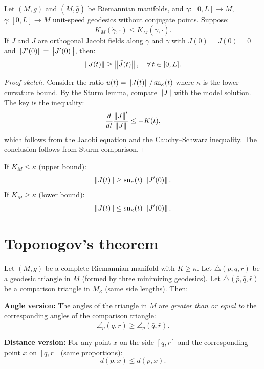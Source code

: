 \begin{theorem}[Rauch]
\label{thm:rauch}
Let $(M, g)$ and $(\bar{M}, \bar{g})$ be Riemannian manifolds, and
$\gamma : [0, L] \to M$, $\bar\gamma : [0, L] \to \bar{M}$ unit-speed geodesics
without conjugate points. Suppose:
\[
    K_M(\dot\gamma, \cdot) \leq K_{\bar{M}}(\dot{\bar\gamma}, \cdot).
\]
If $J$ and $\bar{J}$ are orthogonal Jacobi fields along $\gamma$ and $\bar\gamma$
with $J(0) = \bar{J}(0) = 0$ and $\left\| J'(0) \right\| = \left\| \bar{J}'(0) \right\|$, then:
\[
    \left\| J(t) \right\| \geq \left\| \bar{J}(t) \right\|, \quad \forall\, t \in [0, L].
\]
\end{theorem}

\begin{proof}[Proof sketch]
Consider the ratio $u(t) = \left\| J(t) \right\|/\operatorname{sn}_\kappa(t)$ where
$\kappa$ is the lower curvature bound. By the Sturm lemma, compare $\left\| J \right\|$
with the model solution. The key is the inequality:
\[
    \frac{d}{dt}\frac{\left\| J \right\|'}{\left\| J \right\|} \leq -K(t),
\]
which follows from the Jacobi equation and the Cauchy--Schwarz inequality.
The conclusion follows from Sturm comparison.
\end{proof}

\begin{corollary}
If $K_M \leq \kappa$ (upper bound):
\[
    \left\| J(t) \right\| \geq \operatorname{sn}_\kappa(t)\, \left\| J'(0) \right\|.
\]
If $K_M \geq \kappa$ (lower bound):
\[
    \left\| J(t) \right\| \leq \operatorname{sn}_\kappa(t)\, \left\| J'(0) \right\|.
\]
\end{corollary}

\section{Toponogov's theorem}

\begin{theorem}
\label{thm:toponogov}
Let $(M, g)$ be a complete Riemannian manifold with $K \geq \kappa$. Let
$\triangle(p, q, r)$ be a geodesic triangle in $M$ (formed by three minimizing
geodesics). Let $\bar\triangle(\bar{p}, \bar{q}, \bar{r})$ be a comparison
triangle in $M_\kappa$ (same side lengths). Then:

\textbf{Angle version:} The angles of the triangle in $M$ are \emph{greater
than or equal to} the corresponding angles of the comparison triangle:
\[
    \angle_p(q, r) \geq \bar\angle_{\bar{p}}(\bar{q}, \bar{r}).
\]

\textbf{Distance version:} For any point $x$ on the side $[q, r]$ and the
corresponding point $\bar{x}$ on $[\bar{q}, \bar{r}]$ (same proportions):
\[
    d(p, x) \leq d(\bar{p}, \bar{x}).
\]
\end{theorem}

